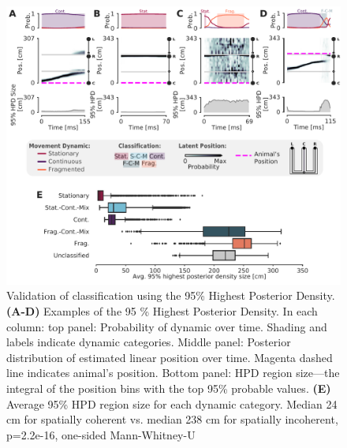 \documentclass[9pt,lineno]{elife}
\providecommand{\DIFaddbeginFL}{} %
\providecommand{\DIFaddendFL}{} %
\providecommand{\DIFdelbeginFL}{} %
\providecommand{\DIFdelendFL}{} %
\newcommand{\DIFscaledelfig}{0.5}
\newlength{\DIFdelgraphicswidth} %
\newlength{\DIFdelgraphicsheight} %
\newcommand{\DIFaddincludegraphics}[2][]{{\color{blue}\fbox{\DIFOincludegraphics[#1]{#2}}}} %
\newcommand{\DIFdelincludegraphics}[2][]{%
\sbox{\DIFdelgraphicsbox}{\DIFOincludegraphics[#1]{#2}}%
\settoboxwidth{\DIFdelgraphicswidth}{\DIFdelgraphicsbox} %
\settoboxtotalheight{\DIFdelgraphicsheight}{\DIFdelgraphicsbox} %
\scalebox{\DIFscaledelfig}{%
\parbox[b]{\DIFdelgraphicswidth}{\usebox{\DIFdelgraphicsbox}\\[-\baselineskip] \rule{\DIFdelgraphicswidth}{0em}}\llap{\resizebox{\DIFdelgraphicswidth}{\DIFdelgraphicsheight}{%
\setlength{\unitlength}{\DIFdelgraphicswidth}%
\begin{picture}(1,1)%
\thicklines\linethickness{2pt} %
{\color[rgb]{1,0,0}\put(0,0){\framebox(1,1){}}}%
{\color[rgb]{1,0,0}\put(0,0){\line( 1,1){1}}}%
{\color[rgb]{1,0,0}\put(0,1){\line(1,-1){1}}}%
\end{picture}%
}\hspace*{3pt}}} %
} %
\DeclareRobustCommand{\DIFaddbeginFL}{\DIFOaddbeginFL \let\includegraphics\DIFaddincludegraphics} %
\DeclareRobustCommand{\DIFaddendFL}{\DIFOaddendFL \let\includegraphics\DIFOincludegraphics} %
\DeclareRobustCommand{\DIFdelbeginFL}{\DIFOdelbeginFL \let\includegraphics\DIFdelincludegraphics} %
\DeclareRobustCommand{\DIFdelendFL}{\DIFOaddendFL \let\includegraphics\DIFOincludegraphics} %
\begin{document}
\begin{figure}
\DIFdelbeginFL %
\DIFdelendFL \DIFaddbeginFL \includegraphics[width=0.80\linewidth]{figures/Figure4/Figure4_final}
\DIFaddendFL \caption{Validation of classification using the 95\% Highest Posterior Density. \textbf{(A-D)}  Examples of the 95 \% Highest Posterior Density. In each column: top panel: Probability of dynamic over time. Shading and labels indicate dynamic categories. Middle panel: Posterior distribution of estimated linear position over time. Magenta dashed line indicates animal's position. Bottom panel: HPD region size---the integral of the position bins with the top 95\% probable values. \textbf{(E)} Average 95\% HPD region size for each dynamic category. Median 24 cm for spatially coherent vs. median 238 cm for spatially incoherent, p=2.2e-16, one-sided Mann-Whitney-U}
\label{fig:4}

\DIFaddbeginFL {}


\end{figure}
\end{document}
